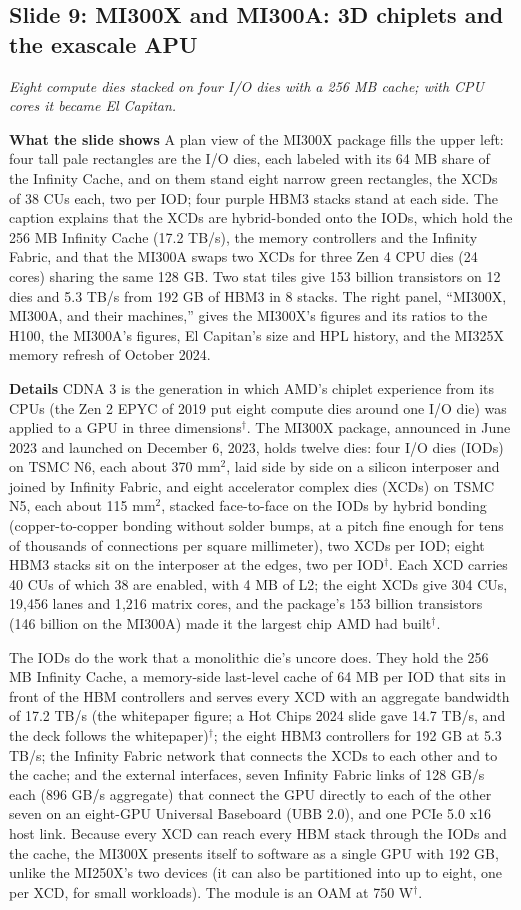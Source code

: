 \documentclass[11pt,letterpaper]{article}
\newcommand{\slide}[3]{%
  \subsection[Slide #1: #2]{Slide #1: #2}%
  {\color{muted}\itshape #3\par}\medskip}
\newcommand{\para}[1]{\medskip\noindent\textbf{#1}\quad}
\begin{document}
\slide{9}{MI300X and MI300A: 3D chiplets and the exascale APU}{Eight compute dies stacked on four I/O dies with a 256 MB cache; with CPU cores it became El Capitan.}

\para{What the slide shows} A plan view of the MI300X package fills the upper left: four tall pale rectangles are the I/O dies, each labeled with its 64 MB share of the Infinity Cache, and on them stand eight narrow green rectangles, the XCDs of 38 CUs each, two per IOD; four purple HBM3 stacks stand at each side. The caption explains that the XCDs are hybrid-bonded onto the IODs, which hold the 256 MB Infinity Cache (17.2 TB/s), the memory controllers and the Infinity Fabric, and that the MI300A swaps two XCDs for three Zen 4 CPU dies (24 cores) sharing the same 128 GB. Two stat tiles give 153 billion transistors on 12 dies and 5.3 TB/s from 192 GB of HBM3 in 8 stacks. The right panel, ``MI300X, MI300A, and their machines,'' gives the MI300X's figures and its ratios to the H100, the MI300A's figures, El Capitan's size and HPL history, and the MI325X memory refresh of October 2024.

\para{Details} CDNA 3 is the generation in which AMD's chiplet experience from its CPUs (the Zen 2 EPYC of 2019 put eight compute dies around one I/O die) was applied to a GPU in three dimensions$^\dagger$. The MI300X package, announced in June 2023 and launched on December 6, 2023, holds twelve dies: four I/O dies (IODs) on TSMC N6, each about 370 mm$^2$, laid side by side on a silicon interposer and joined by Infinity Fabric, and eight accelerator complex dies (XCDs) on TSMC N5, each about 115 mm$^2$, stacked face-to-face on the IODs by hybrid bonding (copper-to-copper bonding without solder bumps, at a pitch fine enough for tens of thousands of connections per square millimeter), two XCDs per IOD; eight HBM3 stacks sit on the interposer at the edges, two per IOD$^\dagger$. Each XCD carries 40 CUs of which 38 are enabled, with 4 MB of L2; the eight XCDs give 304 CUs, 19{,}456 lanes and 1{,}216 matrix cores, and the package's 153 billion transistors (146 billion on the MI300A) made it the largest chip AMD had built$^\dagger$.

The IODs do the work that a monolithic die's uncore does. They hold the 256 MB Infinity Cache, a memory-side last-level cache of 64 MB per IOD that sits in front of the HBM controllers and serves every XCD with an aggregate bandwidth of 17.2 TB/s (the whitepaper figure; a Hot Chips 2024 slide gave 14.7 TB/s, and the deck follows the whitepaper)$^\dagger$; the eight HBM3 controllers for 192 GB at 5.3 TB/s; the Infinity Fabric network that connects the XCDs to each other and to the cache; and the external interfaces, seven Infinity Fabric links of 128 GB/s each (896 GB/s aggregate) that connect the GPU directly to each of the other seven on an eight-GPU Universal Baseboard (UBB 2.0), and one PCIe 5.0 x16 host link. Because every XCD can reach every HBM stack through the IODs and the cache, the MI300X presents itself to software as a single GPU with 192 GB, unlike the MI250X's two devices (it can also be partitioned into up to eight, one per XCD, for small workloads). The module is an OAM at 750 W$^\dagger$.
\end{document}
